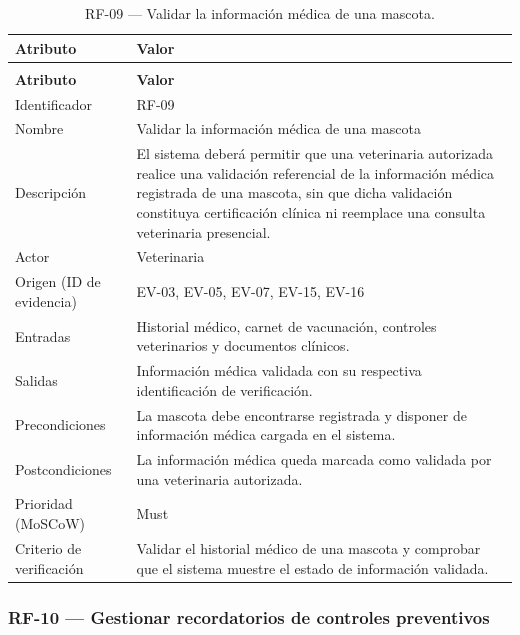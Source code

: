 \documentclass[journal,onecolumn]{IEEEtran}
\makeatletter
\newenvironment{atributos}[2]{%
	\small
	\begin{longtable}{@{}>{\raggedright\arraybackslash}p{4.2cm} >{\raggedright\arraybackslash}p{11.2cm}@{}}
		\caption{#2}\label{tab:#1}\\
		\toprule
		\textbf{Atributo} & \textbf{Valor} \\
		\midrule
		\endfirsthead
		\multicolumn{2}{@{}l}{\small\itshape (continuación)}\\
		\toprule
		\textbf{Atributo} & \textbf{Valor} \\
		\midrule
		\endhead
		\bottomrule
		\endlastfoot
	}{%
	\end{longtable}
	\normalsize
}
\makeatother
\begin{document}
	\begin{atributos}{RF-09}{RF-09 --- Validar la información médica de una mascota.}
		Identificador & RF-09 \\
		Nombre & Validar la información médica de una mascota \\
		Descripción & El sistema deberá permitir que una veterinaria autorizada realice una validación referencial de la información médica registrada de una mascota, sin que dicha validación constituya certificación clínica ni reemplace una consulta veterinaria presencial. \\
		Actor & Veterinaria \\
		Origen (ID de evidencia) & EV-03, EV-05, EV-07, EV-15, EV-16 \\
		Entradas & Historial médico, carnet de vacunación, controles veterinarios y documentos clínicos. \\
		Salidas & Información médica validada con su respectiva identificación de verificación. \\
		Precondiciones & La mascota debe encontrarse registrada y disponer de información médica cargada en el sistema. \\
		Postcondiciones & La información médica queda marcada como validada por una veterinaria autorizada. \\
		Prioridad (MoSCoW) & Must \\
		Criterio de verificación & Validar el historial médico de una mascota y comprobar que el sistema muestre el estado de información validada. \\
	\end{atributos}
	
	\subsubsection{RF-10 --- Gestionar recordatorios de controles preventivos}
	
\end{document}
